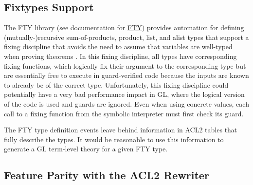 \documentclass[submission,copyright,creativecommons]{eptcs}
\begin{document}
\subsection{Fixtypes Support}
The FTY library (see documentation for
\href{http://www.cs.utexas.edu/users/moore/acl2/manuals/current/manual/?topic=ACL2____FTY}{FTY})
provides automation for defining (mutually-)recursive sum-of-products,
product, list, and alist types that support a fixing discipline that
avoids the need to assume that variables are well-typed when proving
theorems \cite{fixyourtypes}.  In this fixing discipline, all types
have corresponding fixing functions, which logically fix their
argument to the corresponding type but are essentially free to execute
in guard-verified code because the inputs are known to already be of
the correct type.  Unfortunately, this fixing discipline could
potentially have a very bad performance impact in GL, where the
logical version of the code is used and guards are ignored.  Even when
using concrete values, each call to a fixing function from the
symbolic interpreter must first check its guard.

The FTY type definition events leave behind information in ACL2 tables
that fully describe the types.  It would be reasonable to use this
information to generate a GL term-level theory for a given FTY type.

\subsection{Feature Parity with the ACL2 Rewriter}
\end{document}
